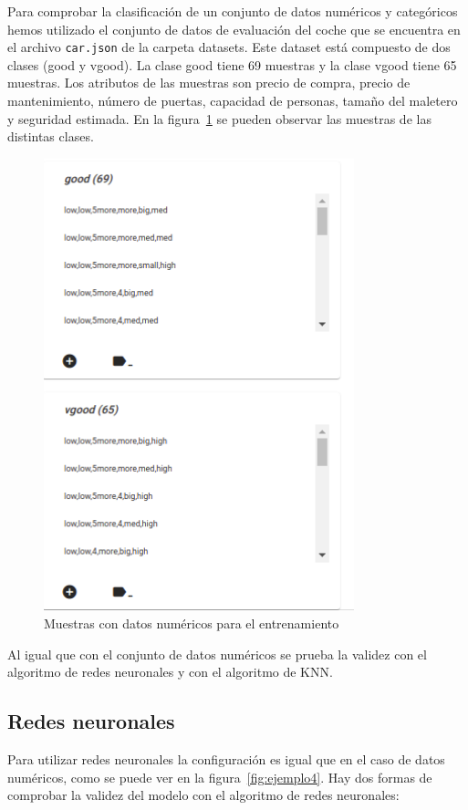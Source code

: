\documentclass[a4paper, 12pt]{book}
\begin{document}
Para comprobar la clasificación de un conjunto de datos numéricos y categóricos hemos utilizado el conjunto de datos de evaluación del coche que se encuentra en el archivo \texttt{car.json} de la carpeta datasets. Este dataset está compuesto de dos clases (good y vgood). La clase good tiene 69 muestras y la clase vgood tiene 65 muestras.
Los atributos de las muestras son precio de compra, precio de mantenimiento, número de puertas, capacidad de personas, tamaño del maletero y seguridad estimada. 
En la figura~\ref{fig:ejemplo17} se pueden observar las muestras de las distintas clases.

\begin{figure}
	\centering
	\includegraphics[width=9cm, keepaspectratio]{img/ejemplo_muestras_numycat.png}
	\caption{Muestras con datos numéricos para el entrenamiento} 	\label{fig:ejemplo17}
\end{figure}

Al igual que con el conjunto de datos numéricos se prueba la validez con el algoritmo de redes neuronales y con el algoritmo de KNN.

\subsection{Redes neuronales}
\label{subsec:redesneuronales2}

Para utilizar redes neuronales la configuración es igual que en el caso de datos numéricos, como se puede ver en la figura~\ref{fig:ejemplo4}.
Hay dos formas de comprobar la validez del modelo con el algoritmo de redes neuronales:
\end{document}
